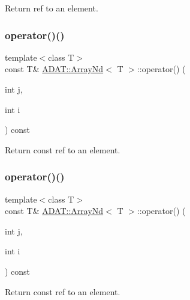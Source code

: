 Return ref to an element. 

\mbox{\label{classADAT_1_1ArrayNd_a476aa275f16078c90cb745312f344194}} 
\subsubsection{\texorpdfstring{operator()()}{operator()()}\hspace{0.1cm}{\footnotesize\ttfamily [7/16]}}
{\footnotesize\ttfamily template$<$class T$>$ \\
const T\& \mbox{\hyperlink{classADAT_1_1ArrayNd}{A\+D\+A\+T\+::\+Array\+Nd}}$<$ T $>$\+::operator() (\begin{DoxyParamCaption}\item[{int}]{j,  }\item[{int}]{i }\end{DoxyParamCaption}) const\hspace{0.3cm}{\ttfamily [inline]}}



Return const ref to an element. 

\mbox{\label{classADAT_1_1ArrayNd_a476aa275f16078c90cb745312f344194}} 
\subsubsection{\texorpdfstring{operator()()}{operator()()}\hspace{0.1cm}{\footnotesize\ttfamily [8/16]}}
{\footnotesize\ttfamily template$<$class T$>$ \\
const T\& \mbox{\hyperlink{classADAT_1_1ArrayNd}{A\+D\+A\+T\+::\+Array\+Nd}}$<$ T $>$\+::operator() (\begin{DoxyParamCaption}\item[{int}]{j,  }\item[{int}]{i }\end{DoxyParamCaption}) const\hspace{0.3cm}{\ttfamily [inline]}}



Return const ref to an element. 

